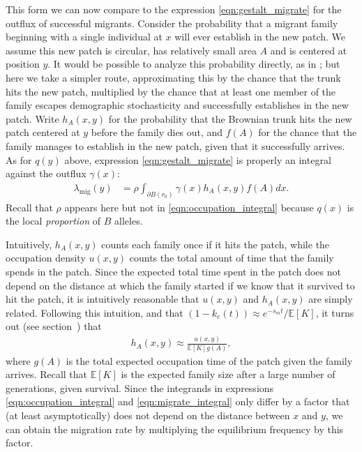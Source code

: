 \documentclass{article}
\newcommand{\citet}[1]{\cite{#1}}
\newcommand{\E}{\mathbb{E}}
\newcommand{\migrate}{\lambda_\text{mig}}
\begin{document}
This form we can now compare to 
the expression \eqref{eqn:gestalt_migrate} for the outflux of successful migrants.
Consider the probability that a migrant family beginning with a single individual at $x$ will ever establish in the new patch.
We assume this new patch is circular, 
has relatively small area $A$ and is centered at position $y$.
It would be possible to analyze this probability directly,
as in \citet{barton1987establishment};
but here we take a simpler route, 
approximating this by the chance that the trunk hits the new patch,
multiplied by the chance that at least one member of the family escapes demographic stochasticity
and successfully establishes in the new patch.
Write $h_A(x,y)$ for the probability that the Brownian trunk
hits the new patch centered at $y$ before the family dies out,
and $f(A)$ for the chance that the family manages to establish in the new patch,
given that it successfully arrives.
As for $q(y)$ above, expression \eqref{eqn:gestalt_migrate} is properly an integral against the outflux $\gamma(x)$:
\begin{align}\label{eqn:migrate_integral}
  \migrate(y) &= \rho \int_{\partial B(r_0)} \gamma(x) h_A(x,y) f(A) dx .
\end{align}
Recall that $\rho$ appears here but not in \eqref{eqn:occupation_integral}
because $q(x)$ is the local \emph{proportion} of $B$ alleles.

Intuitively, $h_A(x,y)$ counts each family once if it hits the patch,
while the occupation density $u(x,y)$ counts the total amount of time that the family spends in the patch.
Since the expected total time spent in the patch does not depend on the distance at which the family started
if we know that it survived to hit the patch,
it is intuitively reasonable that $u(x,y)$ and $h_A(x,y)$ are simply related.
Following this intuition,
and that $(1-k_e(t)) \approx e^{-s_m t}/\E[K]$,
it turns out (see section~) that
\begin{align} 
    h_A(x,y) \approx \frac{ u(x,y) }{ \E[K] g(A) } ,
\end{align}
where $g(A)$ is the total expected occupation time of the patch given the family arrives.
Recall that $\E[K]$ is the expected family size after a large number of generations, given survival.
Since the integrands in expressions \ref{eqn:occupation_integral} and \ref{eqn:migrate_integral} only differ by a factor
that (at least asymptotically) does not depend on the distance between $x$ and $y$,
we can obtain the migration rate by multiplying the equilibrium frequency by this factor.
\end{document}
